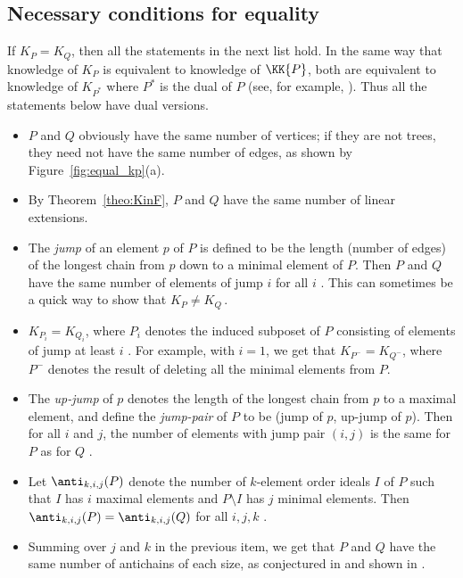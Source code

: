 \subsection{Necessary conditions for equality}

If $K_P = K_Q$, then all the statements in the next list hold. In the same way that knowledge of $K_P$ is equivalent to knowledge of $\KK{P}$, both are equivalent to knowledge of $K_{P^*}$ where $P^*$ is the dual of $P$ (see, for example, \cite[\S 3]{McWa14}).  Thus all the statements below have dual versions.

\begin{itemize}
\item $P$ and $Q$ obviously have the same number of vertices; if they are not trees, they need not have the same number of edges, as shown by Figure~\ref{fig:equal_kp}(a).
\item By Theorem~\ref{theo:KinF}, $P$ and $Q$ have the same number of linear extensions.
\item The \emph{jump} of an element $p$ of $P$ is defined to be the length (number of edges) of the longest chain from $p$ down to a minimal element of $P$.  Then $P$ and $Q$ have the same number of elements of jump $i$ for all $i$  \cite{McWa14}.  This can sometimes be a quick way to show that $K_P \neq K_Q$\,.

\item $K_{P_i} = K_{Q_i}$, where $P_i$ denotes the induced subposet of $P$ consisting of elements of jump at least $i$ \cite{McWa14}.  For example, with $i=1$, we get that $K_{P^-} = K_{Q^-}$, where $P^-$ denotes the result of deleting all the minimal elements from $P$.

\item The \emph{up-jump} of $p$ denotes the length of the longest chain from $p$ to a maximal element, and define the \emph{jump-pair} of $P$ to be (jump of $p$, up-jump of $p$).  Then for all $i$ and $j$, the number of elements with jump pair $(i,j)$ is the same for $P$ as for $Q$ \cite{LiWe20}.

\item Let $\anti_{k,i,j}(P)$ denote the number of $k$-element order ideals $I$ of $P$ such that $I$ has $i$ maximal elements and $P\setminus I$ has $j$ minimal elements.  Then $\anti_{k,i,j}(P) = \anti_{k,i,j}(Q)$ for all $i,j,k$ \cite{LiWe20}.

\item Summing over $j$ and $k$ in the previous item, we get that $P$ and $Q$ have the same number of antichains of each size, as conjectured in \cite{McWa14} and shown in \cite{LiWe20}.


\end{itemize}
